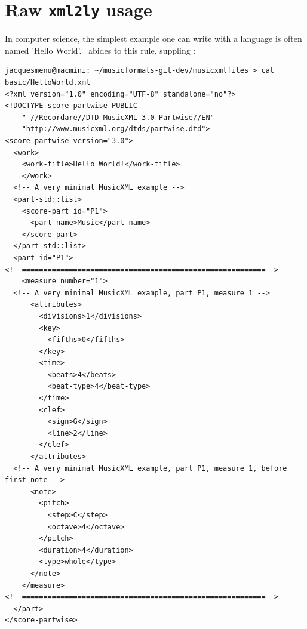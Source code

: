 



\chapter{Raw {\tt xml2ly} usage}

In computer science, the simplest example one can write with a language is often named 'Hello World'. \mf\ abides to this rule, suppling :
\begin{lstlisting}[language=MusicXML]
jacquesmenu@macmini: ~/musicformats-git-dev/musicxmlfiles > cat basic/HelloWorld.xml
<?xml version="1.0" encoding="UTF-8" standalone="no"?>
<!DOCTYPE score-partwise PUBLIC
    "-//Recordare//DTD MusicXML 3.0 Partwise//EN"
    "http://www.musicxml.org/dtds/partwise.dtd">
<score-partwise version="3.0">
  <work>
    <work-title>Hello World!</work-title>
    </work>
  <!-- A very minimal MusicXML example -->
  <part-std::list>
    <score-part id="P1">
      <part-name>Music</part-name>
    </score-part>
  </part-std::list>
  <part id="P1">
<!--=========================================================-->
    <measure number="1">
  <!-- A very minimal MusicXML example, part P1, measure 1 -->
      <attributes>
        <divisions>1</divisions>
        <key>
          <fifths>0</fifths>
        </key>
        <time>
          <beats>4</beats>
          <beat-type>4</beat-type>
        </time>
        <clef>
          <sign>G</sign>
          <line>2</line>
        </clef>
      </attributes>
  <!-- A very minimal MusicXML example, part P1, measure 1, before first note -->
      <note>
        <pitch>
          <step>C</step>
          <octave>4</octave>
        </pitch>
        <duration>4</duration>
        <type>whole</type>
      </note>
    </measure>
<!--=========================================================-->
  </part>
</score-partwise>
\end{lstlisting}


